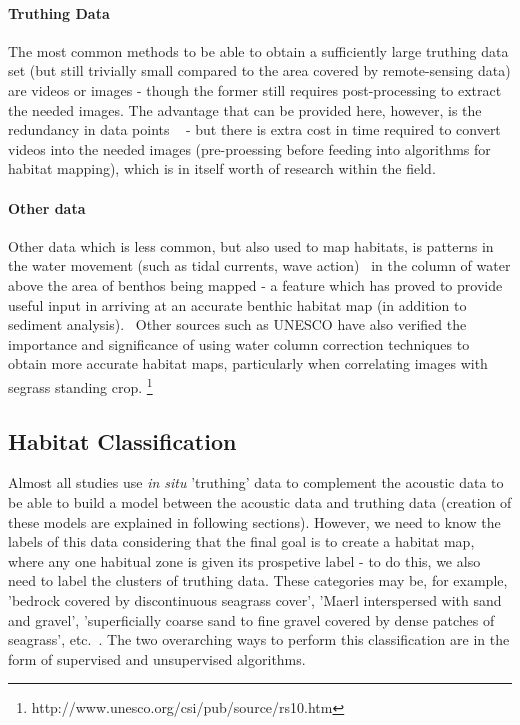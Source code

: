 \documentclass[12pt]{article}
\begin{document}
            \paragraph{Truthing Data}
            The most common methods to be able to obtain a sufficiently large truthing data set (but still trivially small compared to the area covered by remote-sensing data) are videos or images - though the former still requires post-processing to extract the needed images. The advantage that can be provided here, however, is the redundancy in data points ~\citep*{rattray14}  - but there is extra cost in time required to convert videos into the needed images (pre-proessing before feeding into algorithms for habitat mapping), which is in itself worth of research within the field.~\citep*{lucieer13}

            \paragraph{Other data}
            Other data which is less common, but also used to map habitats, is patterns in the water movement (such as tidal currents, wave action)~\citep*{cjbrown11} in the column of water above the area of benthos being mapped - a feature which has proved to provide useful input in arriving at an accurate benthic habitat map (in addition to sediment analysis).~\citep*{snelgrove94} Other sources such as UNESCO have also verified the importance and significance of using water column correction techniques to obtain more accurate habitat maps, particularly when correlating images with segrass standing crop. \footnote{http://www.unesco.org/csi/pub/source/rs10.htm} 

            \subsection{Habitat Classification}

            Almost all studies use \textit{in situ} 'truthing' data to complement the acoustic data to be able to build a model between the acoustic data and truthing data (creation of these models are explained in following sections). However, we need to know the labels of this data considering that the final goal is to create a habitat map, where any one habitual zone is given its prospetive label - to do this, we also need to label the clusters of truthing data. These categories may be, for example, 'bedrock covered by discontinuous seagrass cover', 'Maerl interspersed with sand and gravel', 'superficially coarse sand to fine gravel covered by dense patches of seagrass', etc.~\citep*{micallef12}. The two overarching ways to perform this classification are in the form of supervised and unsupervised algorithms.
\end{document}
